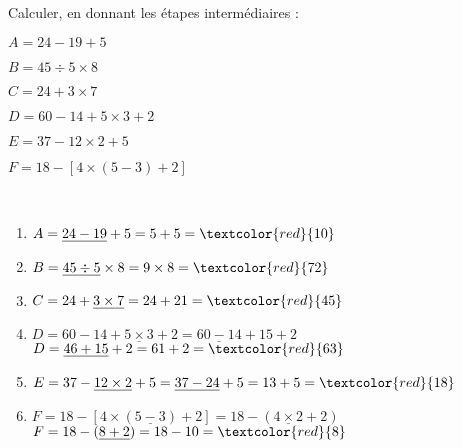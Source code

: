 \begin{exercice*} %
   Calculer, en donnant les étapes intermédiaires :

   \begin{minipage}{0.4\linewidth}
      \begin{list}{}{}
         \item $A=24-19+5$
         \item $B=45\div5\times8$
         \item $C=24+3\times7$
      \end{list}
   \end{minipage}
   \begin{minipage}{0.6\linewidth}
      \begin{list}{}{}
         \item $D=60-14+5\times3+2$
         \item $E=37-12\times2+5$
         \item $F=18-[4\times(5-3)+2]$
      \end{list}
   \end{minipage}
\end{exercice*}

\begin{corrige}
   \ \\ [-5mm]
   \begin{enumerate}
      \item $A=\underline{24-19}+5 =5+5 =\textcolor{red}{10}$ \smallskip
      \item $B=\underline{45\div5}\times8 =9\times8 =\textcolor{red}{72}$ \smallskip
      \item $C=24+\underline{3\times7} =24+21 =\textcolor{red}{45}$ \smallskip
      \item $D=60-14+\underline{5\times3}+2 =\underline{60-14}+15+2$ \\
            $D=\underline{46+15}+2 =61+2 =\textcolor{red}{63}$ \smallskip
      \item $E=37-\underline{12\times2}+5 =\underline{37-24}+5 =13+5 =\textcolor{red}{18}$ \smallskip
      \item $F=18-[4\times(\underline{5-3})+2] =18-(\underline{4\times2}+2)$ \\
            $F=18-(\underline{8+2}) =18-10 =\textcolor{red}{8}$
   \end{enumerate}
\end{corrige}